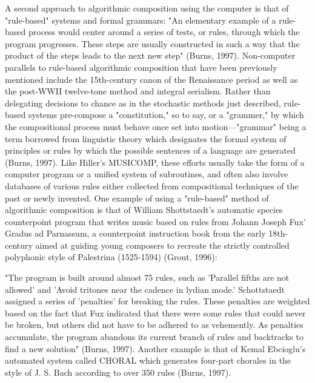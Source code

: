 \documentclass{automatextcc}
\begin{document}
A second approach to algorithmic composition using the computer is that of "rule-based" systems and formal grammars: "An elementary example of a rule-based process would center around a series of tests, or rules, through which the program progresses. These steps are usually constructed in such a way that the product of the steps leads to the next new step" (Burns, 1997). Non-computer parallels to rule-based algorithmic composition that have been previously mentioned include the 15th-century canon of the Renaissance period as well as the post-WWII twelve-tone method and integral serialism. Rather than delegating decisions to chance as in the stochastic methods just described, rule-based systems pre-compose a "constitution," so to say, or a "grammer," by which the compositional process must behave once set into motion—"grammar" being a term borrowed from linguistic theory which designates the formal system of principles or rules by which the possible sentences of a language are generated (Burns, 1997). Like Hiller's MUSICOMP, these efforts usually take the form of a computer program or a unified system of subroutines, and often also involve databases of various rules either collected from compositional techniques of the past or newly invented. One example of using a "rule-based" method of algorithmic composition is that of William Shottstaedt's automatic species counterpoint program that writes music based on rules from Johann Joseph Fux' Gradus ad Parnassum, a counterpoint instruction book from the early 18th-century aimed at guiding young composers to recreate the strictly controlled polyphonic style of Palestrina (1525-1594) (Grout, 1996):

"The program is built around almost 75 rules, such as 'Parallel fifths are not allowed' and 'Avoid tritones near the cadence in lydian mode.' Schottstaedt assigned a series of 'penalties' for breaking the rules. These penalties are weighted based on the fact that Fux indicated that there were some rules that could never be broken, but others did not have to be adhered to as vehemently. As penalties accumulate, the program abandons its current branch of rules and backtracks to find a new solution" (Burns, 1997).
Another example is that of Kemal Ebcioglu's automated system called CHORAL which generates four-part chorales in the style of J. S. Bach according to over 350 rules (Burns, 1997).
\end{document}
